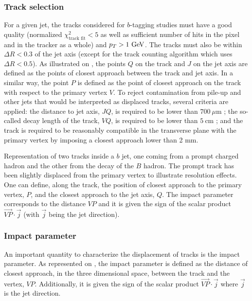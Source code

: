     \subsubsection{Track selection}

    For a given jet, the tracks considered for $b$-tagging studies must have a
    good quality (normalized $\chi^2_\text{track fit} < 5$ as well as sufficient
    number of hits in the pixel and in the tracker as a whole) and $p_T >
    1~\text{GeV}$. The tracks must also be within $\Delta R < 0.3$ of the jet axis
    (except for the track counting algorithm which uses $\Delta R < 0.5$).  As
    illustrated on , the points $Q$ on the
    track and $J$ on the jet axis are defined as the points of closest approach
    between the track and jet axis. In a similar way, the point $P$ is defined
    as the point of closest approach on the track with respect to the primary
    vertex $V$. To reject contamination from pile-up and other jets that would
    be interpreted as displaced tracks, several criteria are applied: the
    distance to jet axis, $JQ$, is required to be lower than $700~{\mu\text{m}}$
    ; the so-called decay length of the track, $VQ$, is required to be lower
    than $5~\text{cm}$ ; and the track is required to be reasonably compatible
    in the transverse plane with the primary vertex by imposing a closest
    approach lower than 2 mm.

     {Representation of two tracks
    inside a $b$ jet, one coming from a prompt charged hadron and the other from
    the decay of the $B$ hadron. The prompt track has been slightly displaced
    from the primary vertex to illustrate resolution effects. One can define,
    along the track, the position of closest approach to the primary vertex,
    $P$, and the closest approach to the jet axis, $Q$. The impact parameter
    corresponds to the distance $VP$ and it is given the sign of the scalar
    product $\vec{VP} \cdot \vec{j}$ (with $\vec{j}$ being the jet direction).}

    \subsubsection{Impact parameter}

    An important quantity to characterize the displacement of tracks is the
    impact parameter.  As represented on ,
    the impact parameter is defined as the distance of closest approach, in the
    three dimensional space, between the track and the vertex, $VP$.
    Additionally, it is given the sign of the scalar product $\vec{VP} \cdot
    \vec{j}$ where $\vec{j}$ is the jet direction.


